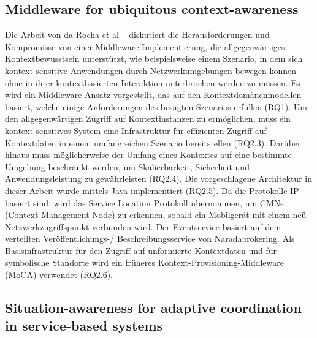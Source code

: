 \documentclass[conference,compsoc]{IEEEtran}
\begin{document}
\subsection{Middleware for ubiquitous context-awareness}
Die Arbeit von da Rocha et al ~\cite{rocha2008middleware} diskutiert die Herausforderungen und Kompromisse von einer Middleware-Implementierung, die allgegenwärtiges Kontextbewusstsein unterstützt, wie beispielsweise einem Szenario, in dem sich kontext-sensitive Anwendungen durch Netzwerkumgebungen bewegen können ohne in ihrer kontextbasierten Interaktion unterbrochen werden zu müssen. Es wird ein Middleware-Ansatz vorgestellt, das auf den Kontextdomänenmodellen basiert, welche einige Anforderungen des besagten Szenarios erfüllen (RQ1). Um den allgegenwärtigen Zugriff auf Kontextinstanzen zu ermöglichen, muss ein kontext-sensitives System eine Infrastruktur für effizienten Zugriff auf Kontextdaten in einem umfangreichen Szenario bereitstellen (RQ2.3). Darüber hinaus muss möglicherweise der Umfang eines Kontextes auf eine bestimmte Umgebung beschränkt werden, um Skalierbarkeit, Sicherheit und Anwendungsleistung zu gewährleisten (RQ2.4). Die vorgeschlagene Architektur in dieser Arbeit wurde mittels Java implementiert (RQ2.5). Da die Protokolle IP-basiert sind, wird das Service Location Protokoll übernommen, um CMNs (Context Management Node) zu erkennen, sobald ein Mobilgerät mit einem neü Netzwerkzugriffspunkt verbunden wird. Der Eventservice basiert auf dem verteilten Veröffentlichungs-/ Beschreibungsservice von Naradabrokering. Als Basisinfrastruktur für den Zugriff auf unformierte Kontextdaten und für symbolische Standorte wird ein früheres Kontext-Provisioning-Middleware (MoCA) verwendet (RQ2.6). 

\subsection{Situation-awareness for adaptive coordination in service-based systems}
\end{document}
